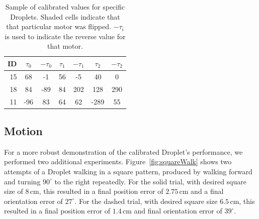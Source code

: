 \documentclass[letterpaper, 10pt, conference]{ieeeconf}
\begin{document}
\begin{table}[!htb]
\centering
\begin{tabular}{r|c|c|c|c|c|c}
 ID & $\tau_0$ & $-\tau_0$ & $\tau_1$ & $-\tau_1$ & $\tau_2$ & $-\tau_2$ \\
\hline
15 & 68 & -1 & 56 & -5 & \cellcolor{gray!15} 40 & \cellcolor{gray!15} 0\\ 
18 & 84 & -89 & 84 & 202 & \cellcolor{gray!15} 128 & \cellcolor{gray!15} 290\\
11 & -96 & 83 & 64 & 62 & -289 & 55 \\
\end{tabular}
\caption{Sample of calibrated values for specific Droplets. Shaded cells indicate that that particular motor was flipped. $-\tau_i$ is used to indicate the reverse value for that motor.}
\label{DropletValueTable}
\end{table}

\subsection{Motion}
For a more robust demonstration of the calibrated Droplet's performance, we performed two additional experiments. Figure~\ref{fig:squareWalk} shows two attempts of a Droplet walking in a square pattern, produced by walking forward and turning $90^\circ$ to the right repeatedly. For the solid trial, with desired square size of $8\,\mathrm{cm}$, this resulted in a final position error of $2.75\,\mathrm{cm}$ and a final orientation error of $27^\circ$. For the dashed trial, with desired square size $6.5\,\mathrm{cm}$, this resulted in a final position error of $1.4\,\mathrm{cm}$ and final orientation error of $39^\circ$.
\end{document}
